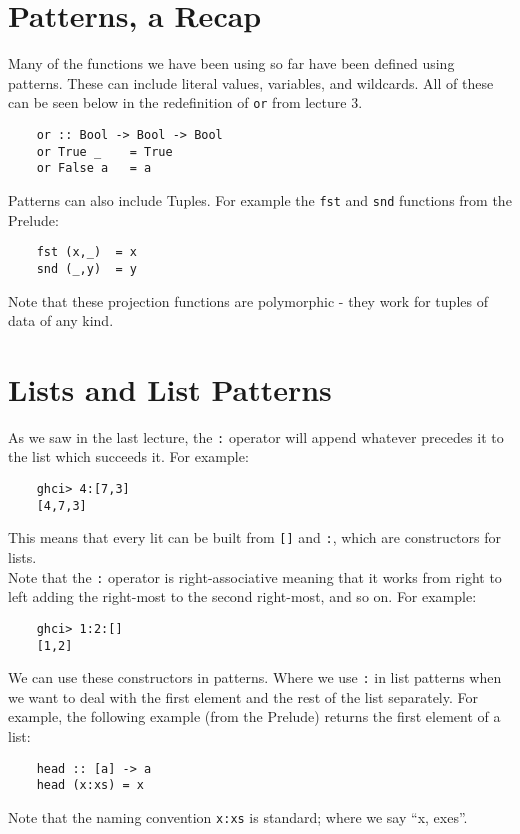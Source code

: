 
\section{Patterns, a Recap}
Many of the functions we have been using so far have been defined using patterns. These can include literal values, variables, and wildcards. All of these can be seen below in the redefinition of \verb|or| from lecture 3.
\begin{verbatim}
    or :: Bool -> Bool -> Bool
    or True _    = True
    or False a   = a
\end{verbatim}

Patterns can also include Tuples. For example the \verb|fst| and \verb|snd| functions from the Prelude:
\begin{verbatim}
    fst (x,_)  = x
    snd (_,y)  = y
\end{verbatim}

Note that these projection functions are polymorphic - they work for tuples of data of any kind. 

\section{Lists and List Patterns}
As we saw in the last lecture, the \verb|:| operator will append whatever precedes it to the list which succeeds it. For example:
\begin{verbatim}
    ghci> 4:[7,3]
    [4,7,3]
\end{verbatim}
This means that every lit can be built from \verb|[]| and \verb|:|, which are constructors for lists.\\

Note that the \verb|:| operator is right-associative meaning that it works from right to left adding the right-most to the second right-most, and so on. For example:
\begin{verbatim}
    ghci> 1:2:[]
    [1,2]
\end{verbatim}

We can use these constructors in patterns. Where we use \verb|:| in list patterns when we want to deal with the first element and the rest of the list separately. For example, the following example (from the Prelude) returns the first element of a list:
\begin{verbatim}
    head :: [a] -> a
    head (x:xs) = x
\end{verbatim}
Note that the naming convention \verb|x:xs| is standard; where we say ``x, exes''.\\

